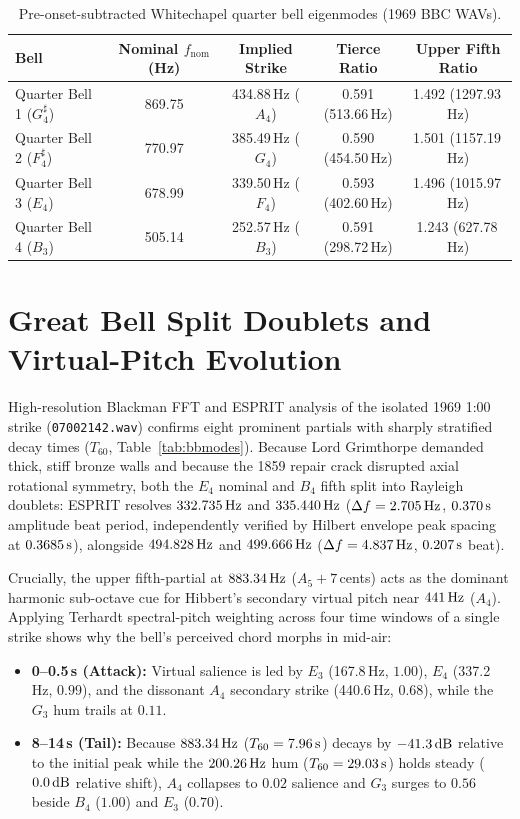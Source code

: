 \documentclass[11pt,a4paper]{article}
\begin{document}
\begin{table}[h!]
\centering\small
\caption{Pre-onset-subtracted Whitechapel quarter bell eigenmodes (1969 BBC WAVs).}
\label{tab:quarters}
\begin{tabular}{@{}lcccc@{}}
\toprule
Bell & Nominal $f_{\mathrm{nom}}$ (Hz) & Implied Strike & Tierce Ratio & Upper Fifth Ratio \\
\midrule
Quarter Bell 1 ($G^\sharp_4$) & 869.75 & 434.88\,Hz ($A_4$) & 0.591 (513.66\,Hz) & 1.492 (1297.93\,Hz) \\
Quarter Bell 2 ($F^\sharp_4$) & 770.97 & 385.49\,Hz ($G_4$) & 0.590 (454.50\,Hz) & 1.501 (1157.19\,Hz) \\
Quarter Bell 3 ($E_4$) & 678.99 & 339.50\,Hz ($F_4$) & 0.593 (402.60\,Hz) & 1.496 (1015.97\,Hz) \\
Quarter Bell 4 ($B_3$) & 505.14 & 252.57\,Hz ($B_3$) & 0.591 (298.72\,Hz) & 1.243 (627.78\,Hz) \\
\bottomrule
\end{tabular}
\end{table}

\section{Great Bell Split Doublets and Virtual-Pitch Evolution}
High-resolution Blackman FFT and ESPRIT analysis of the isolated 1969 1:00 strike (\texttt{07002142.wav}) confirms eight prominent partials with sharply stratified decay times ($T_{60}$, Table~\ref{tab:bbmodes}). Because Lord Grimthorpe demanded thick, stiff bronze walls and because the 1859 repair crack disrupted axial rotational symmetry, both the $E_4$ nominal and $B_4$ fifth split into Rayleigh doublets: ESPRIT resolves $332.735\text{\,Hz}$ and $335.440\text{\,Hz}$ ($\Delta f = 2.705\text{\,Hz}$, $0.370\text{\,s}$ amplitude beat period, independently verified by Hilbert envelope peak spacing at $0.3685\text{\,s}$), alongside $494.828\text{\,Hz}$ and $499.666\text{\,Hz}$ ($\Delta f = 4.837\text{\,Hz}$, $0.207\text{\,s}$ beat).

Crucially, the upper fifth-partial at $883.34\text{\,Hz}$ ($A_5 +7$\,cents) acts as the dominant harmonic sub-octave cue for Hibbert's secondary virtual pitch near $441\text{\,Hz}$ ($A_4$). Applying Terhardt spectral-pitch weighting across four time windows of a single strike shows why the bell's perceived chord morphs in mid-air:
\begin{itemize}
\item \textbf{0--0.5\,s (Attack):} Virtual salience is led by $E_3$ (167.8\,Hz, $1.00$), $E_4$ (337.2\,Hz, $0.99$), and the dissonant $A_4$ secondary strike (440.6\,Hz, $0.68$), while the $G_3$ hum trails at $0.11$.
\item \textbf{8--14\,s (Tail):} Because $883.34\text{\,Hz}$ ($T_{60}=7.96\text{\,s}$) decays by $-41.3\text{\,dB}$ relative to the initial peak while the $200.26\text{\,Hz}$ hum ($T_{60}=29.03\text{\,s}$) holds steady ($0.0\text{\,dB}$ relative shift), $A_4$ collapses to $0.02$ salience and $G_3$ surges to $0.56$ beside $B_4$ ($1.00$) and $E_3$ ($0.70$).
\end{itemize}
\end{document}
